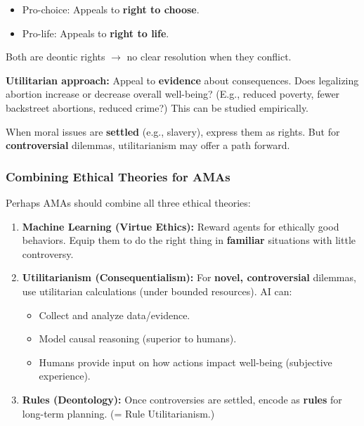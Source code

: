 \begin{tipbox}
\begin{itemize}
  \item Pro-choice: Appeals to \textbf{right to choose}.
  \item Pro-life: Appeals to \textbf{right to life}.
\end{itemize}

Both are deontic rights $\to$ no clear resolution when they conflict.

\textbf{Utilitarian approach:} Appeal to \textbf{evidence} about consequences. Does legalizing abortion increase or decrease overall well-being? (E.g., reduced poverty, fewer backstreet abortions, reduced crime?) This can be studied empirically.

When moral issues are \textbf{settled} (e.g., slavery), express them as rights. But for \textbf{controversial} dilemmas, utilitarianism may offer a path forward.
\end{tipbox}

\bigseparator

\subsubsection{Combining Ethical Theories for AMAs}

\begin{thmbox}
Perhaps AMAs should combine all three ethical theories:

\begin{enumerate}
  \item \textbf{Machine Learning (Virtue Ethics):} Reward agents for ethically good behaviors. Equip them to do the right thing in \textbf{familiar} situations with little controversy.
  
  \item \textbf{Utilitarianism (Consequentialism):} For \textbf{novel, controversial} dilemmas, use utilitarian calculations (under bounded resources). AI can:
  \begin{itemize}
    \item Collect and analyze data/evidence.
    \item Model causal reasoning (superior to humans).
    \item Humans provide input on how actions impact well-being (subjective experience).
  \end{itemize}
  
  \item \textbf{Rules (Deontology):} Once controversies are settled, encode as \textbf{rules} for long-term planning. (= Rule Utilitarianism.)
\end{enumerate}
\end{thmbox}

